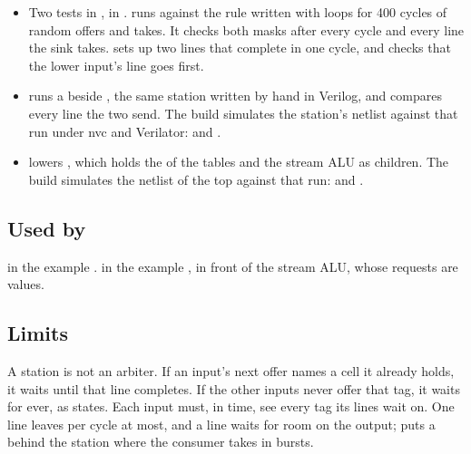 \begin{itemize}
\item Two tests in , in
.  runs
 against the rule written with loops
for 400 cycles of random offers and takes. It checks both masks after
every cycle and every line the sink takes.
 sets up two lines that complete in
one cycle, and checks that the lower input's line goes first.
\item {} runs a 
beside , the same station written by hand in Verilog,
and compares every line the two send. The build simulates the
station's netlist against that run under nvc and Verilator:
 and
.
\item {} lowers , which holds the
 of the tables and the stream ALU as children. The build
simulates the netlist of the top against that run:
 and
.
\end{itemize}

\subsection*{Used by}

 in the example .  in
the example , in front of the stream ALU, whose
requests are  values.

\subsection*{Limits}

A station is not an arbiter. If an input's next offer names a cell it
already holds, it waits until that line completes. If the other inputs
never offer that tag, it waits for ever, as 
states. Each input must, in time, see every tag its lines wait on. One
line leaves per cycle at most, and a line waits for room on the output;
 puts a  behind the station where the
consumer takes in bursts.
